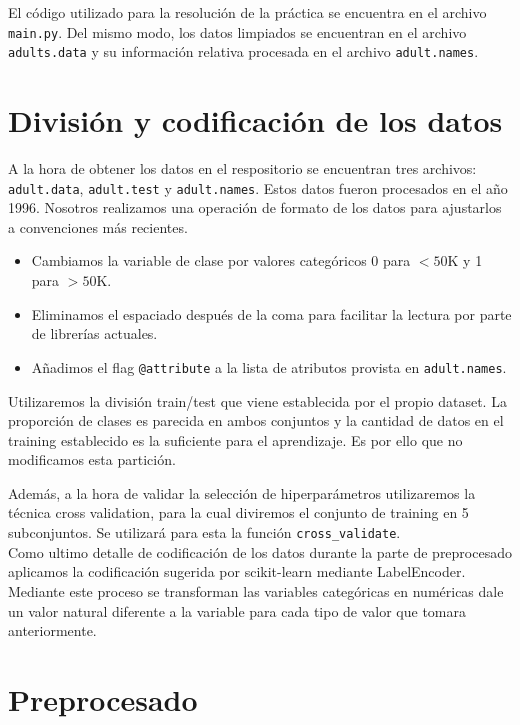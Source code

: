 \documentclass[11pt,a4paper]{article}
\begin{document}
El código utilizado para la resolución de la práctica se encuentra en el archivo \texttt{main.py}.  Del mismo modo, los datos limpiados se encuentran en el archivo \texttt{adults.data} y su información relativa procesada en el archivo \texttt{adult.names}.


\section{ División y codificación de los datos}

A la hora de obtener los datos en el respositorio se encuentran tres archivos: \texttt{adult.data},  \texttt{adult.test} y \texttt{adult.names}. Estos datos fueron procesados en el año 1996. Nosotros realizamos una operación de formato de los datos para ajustarlos a convenciones más recientes.

\begin{itemize}
\item Cambiamos la variable de clase por valores categóricos 0 para $<50$K y 1 para $>50$K.
\item Eliminamos el espaciado después de la coma para facilitar la lectura por parte de librerías actuales.
\item Añadimos el flag \texttt{@attribute} a la lista de atributos provista en \texttt{adult.names}.
\end{itemize}

Utilizaremos la división train/test que viene establecida por el propio dataset. La proporción de clases es parecida en ambos conjuntos y la cantidad de datos en el training establecido es la suficiente para el aprendizaje. Es por ello que no modificamos esta partición.

Además, a la hora de validar la selección de hiperparámetros utilizaremos la técnica cross validation, para la cual diviremos el conjunto de training en 5 subconjuntos. Se utilizará para esta la función \texttt{cross\_validate}\cite{cv}.\\

Como ultimo detalle de codificación de los datos durante la parte de preprocesado aplicamos la codificación sugerida por scikit-learn mediante LabelEncoder. Mediante este proceso se transforman las variables categóricas en numéricas dale un valor natural diferente a la variable para cada tipo de valor que tomara anteriormente.

\section{Preprocesado}
\end{document}

